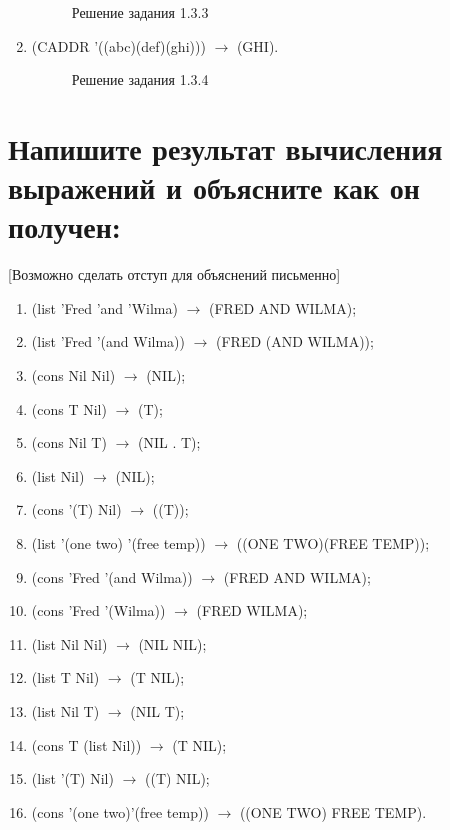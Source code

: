 \documentclass[12pt]{report}
\begin{document}
\begin{enumerate}
\begin{figure}[!h]
		\caption{Решение задания 1.3.3}
	\end{figure}
	\item (CADDR '((abc)(def)(ghi))) $\to$ (GHI).
	\begin{figure}[!h]
		\caption{Решение задания 1.3.4}
	\end{figure}
\end{enumerate}

\section{Напишите результат вычисления выражений и объясните как он получен:}

[Возможно сделать отступ для объяснений письменно]

\begin{enumerate}
	\item (list 'Fred 'and 'Wilma) $\to$ (FRED AND WILMA);
	\item (list 'Fred '(and Wilma)) $\to$ (FRED (AND WILMA));
	\item (cons Nil Nil) $\to$ (NIL);
	\item (cons T Nil) $\to$ (T);
	\item (cons Nil T) $\to$ (NIL . T);
	\item (list Nil) $\to$ (NIL);
	\item (cons '(T) Nil) $\to$ ((T));
	\item (list '(one two) '(free temp)) $\to$ ((ONE TWO)(FREE TEMP));
	\item (cons 'Fred '(and Wilma)) $\to$ (FRED AND WILMA);
	\item (cons 'Fred '(Wilma)) $\to$ (FRED WILMA);
	\item (list Nil Nil) $\to$ (NIL NIL);
	\item (list T Nil) $\to$ (T NIL);
	\item (list Nil T) $\to$ (NIL T);
	\item (cons T (list Nil)) $\to$ (T NIL);
	\item (list '(T) Nil) $\to$ ((T) NIL);
	\item (cons '(one two)'(free temp)) $\to$ ((ONE TWO) FREE TEMP).
\end{enumerate}
\end{document}
